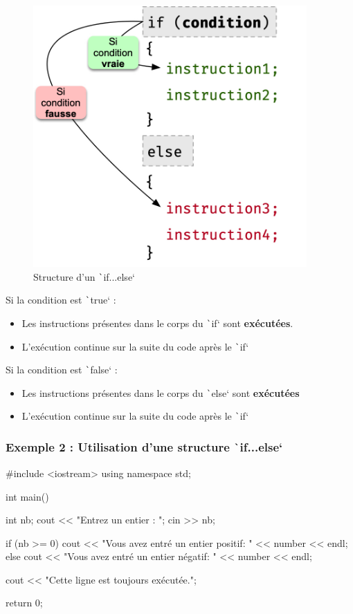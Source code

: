 \documentclass[10pt]{article}
\begin{document}
\begin{multicols}{2}
\begin{figure}[H]
    \includegraphics[max height=10cm,max width = \textwidth/2]{assets/ifElse.jpg}
    \centering
    \caption{Structure d'un \texttt`if...else`}
\end{figure}

Si la condition est \texttt`true` :
\begin{itemize}
    \item Les instructions présentes dans le corps du \texttt`if` sont \textbf{exécutées}.
    \item L'exécution continue sur la suite du code après le \texttt`if`
\end{itemize}
Si la condition est \texttt`false` :
\begin{itemize}
    \item Les instructions présentes dans le corps du \texttt`else` sont \textbf{exécutées}
    \item L'exécution continue sur la suite du code après le \texttt`if` 
\end{itemize}
\end{multicols}

\subsubsection{Exemple 2 : Utilisation d'une structure \texttt`if...else`}
\begin{cppcode}
    #include <iostream>
    using namespace std;

    int main() {
        int nb;
        cout << "Entrez un entier : ";
        cin >> nb;

        if (nb >= 0) {
            cout << "Vous avez entré un entier positif: " << number << endl;
        }
        else {
            cout << "Vous avez entré un entier négatif: " << number << endl;
        }

        cout << "Cette ligne est toujours exécutée.";

        return 0;
    }

\end{cppcode}
\end{document}
